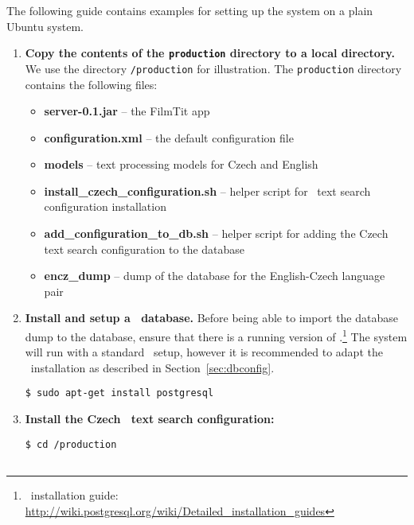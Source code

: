 The following guide contains examples for setting up the system on a plain Ubuntu system.

\begin{enumerate}

\item \textbf{Copy the contents of the {\tt production} directory to a local directory.} We use the directory {\tt /production} for illustration. The {\tt production} directory contains the following files:

\begin{itemize}
	\item \textbf{server-0.1.jar} -- the FilmTit app
	\item \textbf{configuration.xml} -- the default configuration file
	\item \textbf{models} -- text processing models for Czech and English
	\item \textbf{install\_czech\_configuration.sh} -- helper script for \postgres~text search configuration installation
	\item \textbf{add\_configuration\_to\_db.sh} -- helper script for adding the Czech text search configuration to the database
	\item \textbf{encz\_dump} -- dump of the database for the English-Czech language pair
\end{itemize}

\item \textbf{Install and setup a \postgres~database.} Before being able to import the database dump to the database, ensure that there is a running version of \postgres.\footnote{\postgres~installation guide: \url{http://wiki.postgresql.org/wiki/Detailed_installation_guides}} The system will run with a standard \postgres~setup, however it is recommended to adapt the \postgres~installation as described in Section~\ref{sec:dbconfig}.

\vspace*{0.5em}
\begin{lstlisting}
$ sudo apt-get install postgresql
\end{lstlisting}
\vspace*{0.5em}


\item \textbf{Install the Czech \postgres~text search configuration:}
\vspace*{0.5em}
\begin{lstlisting}
$ cd /production


\end{lstlisting}
\end{enumerate}
